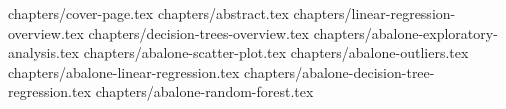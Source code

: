 \documentclass[a4paper,12pt]{article}
\begin{document}
 
 
 

{chapters/cover-page.tex}
\tableofcontents
\clearpage
{chapters/abstract.tex}
{chapters/linear-regression-overview.tex}
{chapters/decision-trees-overview.tex}
{chapters/abalone-exploratory-analysis.tex}
{chapters/abalone-scatter-plot.tex}
{chapters/abalone-outliers.tex}
{chapters/abalone-linear-regression.tex}
{chapters/abalone-decision-tree-regression.tex}
{chapters/abalone-random-forest.tex}
 


\end{document}

